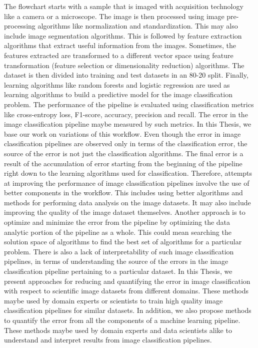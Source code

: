 The flowchart starts with a sample that is imaged with acquisition technology like a camera or a microscope. The image is then processed using image pre-processing algorithms like normalization and standardization. This may also include image segmentation algorithms. This is followed by feature extraction algorithms that extract useful information from the images. Sometimes, the features extracted are transformed to a different vector space using feature transformation (feature selection or dimensionality reduction) algorithms. The dataset is then divided into training and test datasets in an 80-20 split. Finally, learning algorithms like random forests and logistic regression are used as learning algorithms to build a predictive model for the image classification problem. The performance of the pipeline is evaluated using classification metrics like cross-entropy loss, F1-score, accuracy, precision and recall.  The error in the image classification pipeline maybe measured by such metrics. In this Thesis, we base our work on variations of this workflow. Even though the error in image classification pipelines are observed only in terms of the classification error, the source of the error is not just the classification algorithms. The final error is a result of the accumulation of error starting from the beginning of the pipeline right down to the learning algorithms used for classification. Therefore, attempts at improving the performance of image classification pipelines involve the use of  better components in the workflow. This includes using better algorithms and methods for performing data analysis on the image datasets. It may also include improving the quality of the image dataset themselves. Another approach  is to optimize and minimize the error from the pipeline by optimizing the data analytic portion of the pipeline as a whole. This could mean searching the solution space of algorithms to find the best set of algorithms for a particular problem. 
There is also a lack of interpretability of such image classification pipelines, in terms of understanding the source of the errors in the image classification pipeline pertaining to a particular dataset. 
 In this Thesis, we present approaches for reducing and quantifying the error in image classification with respect to scientific image datasets from different domains. These methods maybe used by domain experts or scientists to train high quality image classification pipelines for similar datasets.  In addition, we also propose methods to quantify the error from all the components of a machine learning pipeline. These methods maybe used by domain experts and data scientists alike to understand and interpret results from image classification pipelines.  

